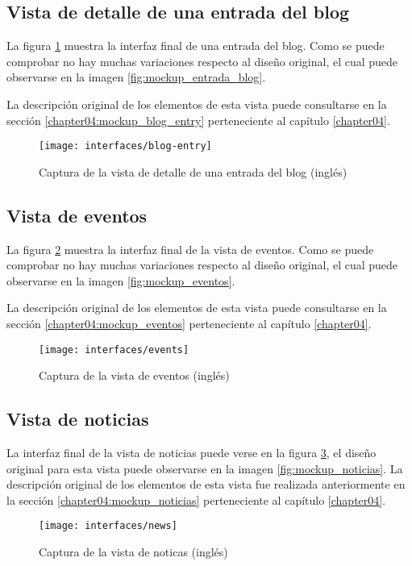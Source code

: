 \subsection{Vista de detalle de una entrada del blog}
La figura \ref{fig:interface_blog_entry} muestra la interfaz final de una entrada del blog.  Como se puede comprobar no hay muchas variaciones respecto al diseño original, el cual puede observarse en la imagen \ref{fig:mockup_entrada_blog}.

La descripción original de los elementos de esta vista puede consultarse en la sección \ref{chapter04:mockup_blog_entry} perteneciente al capítulo \ref{chapter04}.

\begin{figure}[h]
	\centering
	\texttt{[image: interfaces/blog-entry]}
	\caption{Captura de la vista de detalle de una entrada del blog (inglés)}
	\label{fig:interface_blog_entry}
\end{figure}

\subsection{Vista de eventos}
La figura \ref{fig:interface_eventos} muestra la interfaz final de la vista de eventos.  Como se puede comprobar no hay muchas variaciones respecto al diseño original, el cual puede observarse en la imagen \ref{fig:mockup_eventos}.

La descripción original de los elementos de esta vista puede consultarse en la sección \ref{chapter04:mockup_eventos} perteneciente al capítulo \ref{chapter04}.

\begin{figure}[h]
	\centering
	\texttt{[image: interfaces/events]}
	\caption{Captura de la vista de eventos (inglés)}
	\label{fig:interface_eventos}
\end{figure}


\subsection{Vista de noticias}
La interfaz final de la vista de noticias puede verse en la figura \ref{fig:interface_noticias}, el diseño original para esta vista puede observarse en la imagen \ref{fig:mockup_noticias}.  La descripción original de los elementos de esta vista fue realizada anteriormente en la sección  \ref{chapter04:mockup_noticias} perteneciente al capítulo \ref{chapter04}.

\begin{figure}[h]
	\centering
	\texttt{[image: interfaces/news]}
	\caption{Captura de la vista de noticas (inglés)}
	\label{fig:interface_noticias}
\end{figure}


